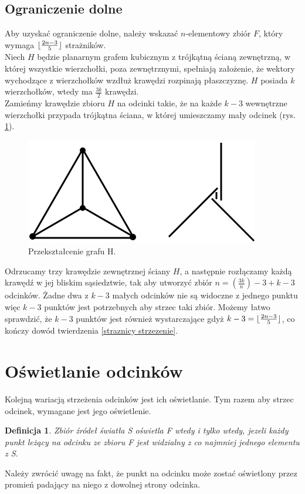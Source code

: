 \documentclass[brudnopis]{xmgr}
\DeclarePairedDelimiter\floor{\lfloor}{\rfloor}
\newtheorem{Definicja}{Definicja}
\begin{document}
\subsection{Ograniczenie dolne}
\indent Aby uzyskać ograniczenie dolne, należy wskazać $n$-elementowy zbiór $F$, który wymaga $\floor{\frac{2n-3}{5}}$ strażników.
\\\indent Niech $H$ będzie planarnym grafem kubicznym z trójkątną ścianą zewnętrzną, w której wszystkie wierzchołki, poza zewnętrznymi, spełniają założenie, że wektory wychodzące z wierzchołków wzdłuż krawędzi rozpinają płaszczyznę.  $H$ posiada $k$ wierzchołków, wtedy ma $\frac{3k}{2}$ krawędzi.
\\\indent Zamieńmy krawędzie zbioru $H$ na odcinki takie, że na każde $k - 3$ wewnętrzne wierzchołki przypada trójkątna ściana, w której umieszczamy mały odcinek (rys. \ref{fig:przeksztalcenie h}).
\begin{figure}[ht!]
 \centering
  \includegraphics{rysunki/dolna_granica.png}
  \caption{Przekształcenie grafu H.}
  \label{fig:przeksztalcenie h}
\end{figure} 
Odrzucamy trzy krawędzie zewnętrznej ściany $H$, a następnie rozłączamy każdą krawędź w jej bliskim sąsiedztwie, tak aby utworzyć zbiór $n = (\frac{3k}{n}) - 3 + k  - 3$ odcinków. Żadne dwa z $k - 3$ małych odcinków nie są widoczne z jednego punktu więc $k - 3$ punktów jest potrzebnych aby strzec taki zbiór. Możemy łatwo sprawdzić, że $k - 3$ punktów jest również wystarczające gdyż $k - 3 = \floor{\frac{2n - 3}{5}}$, co kończy dowód twierdzenia \ref{straznicy strzezenie}.

\section{Oświetlanie odcinków}\label{oświetlanie odcinków}
Kolejną wariacją strzeżenia odcinków jest ich oświetlanie. Tym razem aby strzec odcinek, wymagane jest jego oświetlenie.
\begin{Definicja}
	Zbiór źródeł światła S \textnormal{oświetla} F wtedy i tylko wtedy, jezeli każdy punkt leżący na odcinku ze zbioru F \textnormal{jest widzialny} z co najmniej jednego elementu z S.
\end{Definicja} Należy zwrócić uwagę na fakt, że punkt na odcinku może zostać oświetlony przez promień padający na niego z dowolnej strony odcinka.
\end{document}

